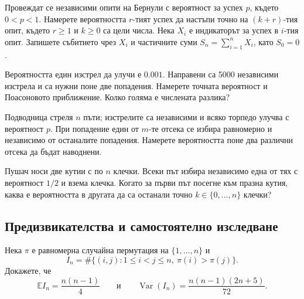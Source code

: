 \documentclass[11pt,a4paper]{article}
\newcommand{\Ebb}{\mathbb E}
\newcommand{\Var}{\operatorname{Var}}
\newcounter{problem}[section]
\begin{document}
\begin{problem}
Провеждат се независими опити на Бернули с вероятност за успех $p$, където
$0<p<1$. Намерете вероятността $r$-тият успех да настъпи точно на
$(k+r)$-тия опит, където $r\ge1$ и $k\ge0$ са цели числа.
Нека $X_i$ е индикаторът за успех в $i$-тия опит. Запишете събитието чрез
$X_i$ и частичните суми $S_n=\sum_{i=1}^nX_i$, като $S_0=0$.
\end{problem}

\begin{problem}
Вероятността един изстрел да улучи е $0.001$. Направени са 5000 независими
изстрела и са нужни поне две попадения. Намерете точната вероятност и
Поасоновото приближение. Колко голяма е числената разлика?
\end{problem}

\begin{problem}
Подводница стреля $n$ пъти; изстрелите са независими и всяко торпедо улучва
с вероятност $p$. При попадение един от $m$-те отсека се избира равномерно и
независимо от останалите попадения. Намерете вероятността поне два различни
отсека да бъдат наводнени.
\end{problem}

\begin{problem}
Пушач носи две кутии с по $n$ клечки. Всеки път избира независимо една от
тях с вероятност $1/2$ и взема клечка. Когато за първи път посегне към празна
кутия, каква е вероятността в другата да са останали точно
$k\in\{0,\dots,n\}$ клечки?
\end{problem}

\subsection*{Предизвикателства и самостоятелно изследване}


\begin{problemstar}
Нека $\pi$ е равномерна случайна пермутация на $\{1,\dots,n\}$ и
\[
I_n=\#\{(i,j):1\le i<j\le n,\ \pi(i)>\pi(j)\}.
\]
Докажете, че
\[
\Ebb I_n=\frac{n(n-1)}4
\qquad\text{и}\qquad
\Var(I_n)=\frac{n(n-1)(2n+5)}{72}.
\]
\end{problemstar}
\end{document}
